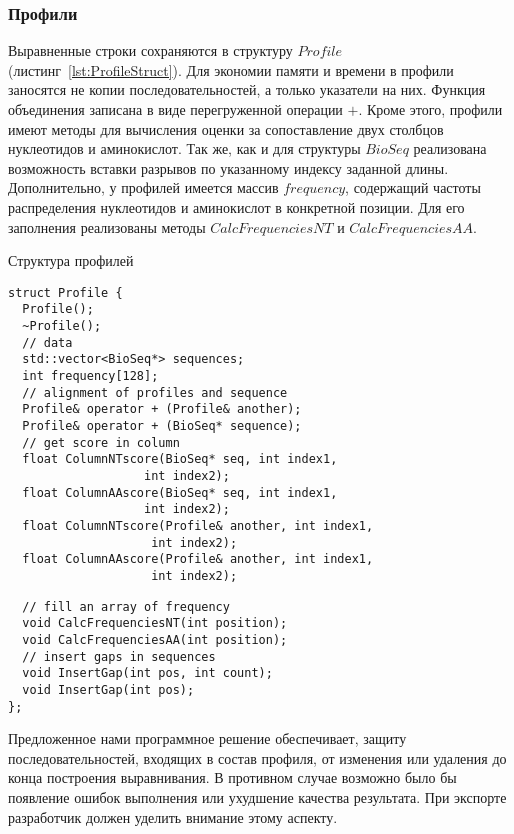 \subsubsection[Профили]{\large Профили}
\hspace{\parindent} Выравненные строки сохраняются в структуру $Profile$ (листинг~\ref{lst:ProfileStruct}). Для экономии памяти и времени в профили заносятся не копии последовательностей, а только указатели на них. Функция объединения записана в виде перегруженной операции $+$. Кроме этого, профили имеют методы для вычисления оценки за сопоставление двух столбцов нуклеотидов и аминокислот. Так же, как и для структуры $BioSeq$ реализована возможность вставки разрывов по указанному индексу заданной длины. Дополнительно, у профилей имеется массив $frequency$, содержащий частоты распределения нуклеотидов и аминокислот в конкретной позиции. Для его заполнения реализованы методы $CalcFrequenciesNT$ и $CalcFrequenciesAA$.\\
\begin{algorithm}
	\caption{Структура профилей} \label{lst:ProfileStruct}
	\begin{lstlisting}
struct Profile {
  Profile();
  ~Profile();
  // data
  std::vector<BioSeq*> sequences;
  int frequency[128];
  // alignment of profiles and sequence
  Profile& operator + (Profile& another);
  Profile& operator + (BioSeq* sequence);
  // get score in column
  float ColumnNTscore(BioSeq* seq, int index1, 
  				   int index2);
  float ColumnAAscore(BioSeq* seq, int index1, 
  				   int index2);
  float ColumnNTscore(Profile& another, int index1, 
  					int index2);
  float ColumnAAscore(Profile& another, int index1, 
   					int index2);
  	\end{lstlisting}
\end{algorithm}

\begin{algorithm}
	\begin{lstlisting}
  // fill an array of frequency
  void CalcFrequenciesNT(int position);
  void CalcFrequenciesAA(int position);
  // insert gaps in sequences
  void InsertGap(int pos, int count);
  void InsertGap(int pos);  
};
	\end{lstlisting}
	
\end{algorithm}

\indent Предложенное нами программное решение обеспечивает, защиту последовательностей, входящих в состав профиля, от изменения или удаления до конца построения выравнивания. В противном случае возможно было бы появление ошибок выполнения или ухудшение качества результата. При экспорте разработчик должен уделить внимание этому аспекту.

